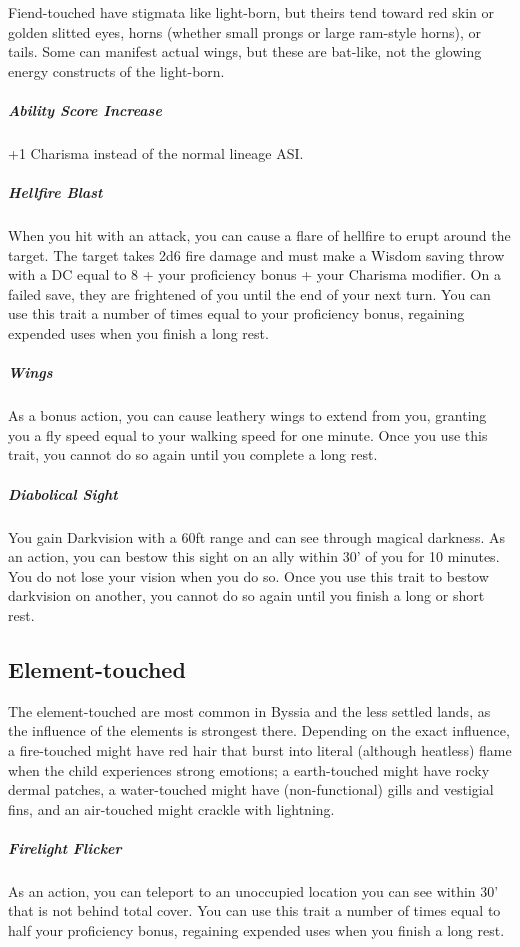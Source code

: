 Fiend-touched have stigmata like light-born, but theirs tend toward red skin or golden slitted eyes, horns (whether small prongs or large ram-style horns), or tails. Some can manifest actual wings, but these are bat-like, not the glowing energy constructs of the light-born.

\subparagraph*{Ability Score Increase}  +1 Charisma instead of the normal lineage ASI.

\subparagraph*{Hellfire Blast}  When you hit with an attack, you can cause a flare of hellfire to erupt around the target. The target takes 2d6 fire damage and must make a Wisdom saving throw with a DC equal to 8 + your proficiency bonus + your Charisma modifier. On a failed save, they are frightened of you until the end of your next turn. You can use this trait a number of times equal to your proficiency bonus, regaining expended uses when you finish a long rest.

\subparagraph*{Wings}  As a bonus action, you can cause leathery wings to extend from you, granting you a fly speed equal to your walking speed for one minute. Once you use this trait, you cannot do so again until you complete a long rest.

\subparagraph*{Diabolical Sight}  You gain Darkvision with a 60ft range and can see through magical darkness. As an action, you can bestow this sight on an ally within 30' of you for 10 minutes. You do not lose your vision when you do so. Once you use this trait to bestow darkvision on another, you cannot do so again until you finish a long or short rest.

\subsection{Element-touched}

The element-touched are most common in Byssia and the less settled lands, as the influence of the elements is strongest there. Depending on the exact influence, a fire-touched might have red hair that burst into literal (although heatless) flame when the child experiences strong emotions; a earth-touched might have rocky dermal patches, a water-touched might have (non-functional) gills and vestigial fins, and an air-touched might crackle with lightning.

\subparagraph*{Firelight Flicker}  As an action, you can teleport to an unoccupied location you can see within 30' that is not behind total cover. You can use this trait a number of times equal to half your proficiency bonus, regaining expended uses when you finish a long rest.

